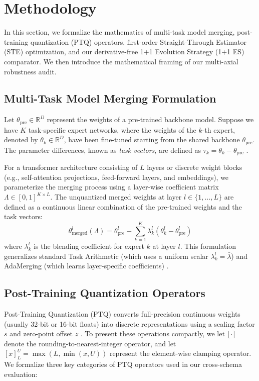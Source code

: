 \section{Methodology}
\label{submission:sec:method}

In this section, we formalize the mathematics of multi-task model merging, post-training quantization (PTQ) operators, first-order Straight-Through Estimator (STE) optimization, and our derivative-free 1+1 Evolution Strategy (1+1 ES) comparator. We then introduce the mathematical framing of our multi-axial robustness audit.

\subsection{Multi-Task Model Merging Formulation}
Let $\theta_{\text{pre}} \in \mathbb{R}^D$ represent the weights of a pre-trained backbone model. Suppose we have $K$ task-specific expert networks, where the weights of the $k$-th expert, denoted by $\theta_k \in \mathbb{R}^D$, have been fine-tuned starting from the shared backbone $\theta_{\text{pre}}$. The parameter differences, known as \emph{task vectors}, are defined as $\tau_k = \theta_k - \theta_{\text{pre}}$ \cite{ilharco2022editing}.

For a transformer architecture consisting of $L$ layers or discrete weight blocks (e.g., self-attention projections, feed-forward layers, and embeddings), we parameterize the merging process using a layer-wise coefficient matrix $\Lambda \in [0, 1]^{K \times L}$. The unquantized merged weights at layer $l \in \{1, \dots, L\}$ are defined as a continuous linear combination of the pre-trained weights and the task vectors:
\begin{equation}
    \theta^l_{\text{merged}}(\Lambda) = \theta^l_{\text{pre}} + \sum_{k=1}^K \lambda^l_k (\theta^l_k - \theta^l_{\text{pre}})
\end{equation}
where $\lambda^l_k$ is the blending coefficient for expert $k$ at layer $l$. This formulation generalizes standard Task Arithmetic (which uses a uniform scalar $\lambda^l_k = \bar{\lambda}$) and AdaMerging (which learns layer-specific coefficients) \cite{yang2023adamerging}.

\subsection{Post-Training Quantization Operators}
Post-Training Quantization (PTQ) converts full-precision continuous weights (usually 32-bit or 16-bit floats) into discrete representations using a scaling factor $s$ and zero-point offset $z$ \cite{nagel2021whitepaper}. To present these operations compactly, we let $\lfloor \cdot \rceil$ denote the rounding-to-nearest-integer operator, and let $[x]_L^U = \max(L, \min(x, U))$ represent the element-wise clamping operator. We formalize three key categories of PTQ operators used in our cross-schema evaluation:

